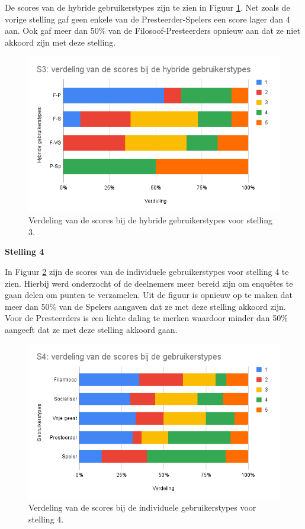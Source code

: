 De scores van de hybride gebruikerstypes zijn te zien in Figuur \ref{fig:s3_hybride}. Net zoals de vorige stelling gaf geen enkele van de Presteerder-Spelers een score lager dan 4 aan. Ook gaf meer dan 50\% van de Filosoof-Presteerders opnieuw aan dat ze niet akkoord zijn met deze stelling.

\begin{figure}
    \includegraphics[width=\linewidth]{S3_Hybride.png}
    \caption{Verdeling van de scores bij de hybride gebruikerstypes voor stelling 3.}
    \label{fig:s3_hybride}
\end{figure}


\textbf{Stelling 4}

In Figuur \ref{fig:s4} zijn de scores van de individuele gebruikerstypes voor stelling 4 te zien. Hierbij werd onderzocht of de deelnemers meer bereid zijn om enquêtes te gaan delen om punten te verzamelen. Uit de figuur is opnieuw op te maken dat meer dan 50\% van de Spelers aangaven dat ze met deze stelling akkoord zijn. Voor de Presteerders is een lichte daling te merken waardoor minder dan 50\% aangeeft dat ze met deze stelling akkoord gaan.

\begin{figure}
    \includegraphics[width=\linewidth]{S4.png}
    \caption{Verdeling van de scores bij de individuele gebruikerstypes voor stelling 4.}
    \label{fig:s4}
\end{figure}

